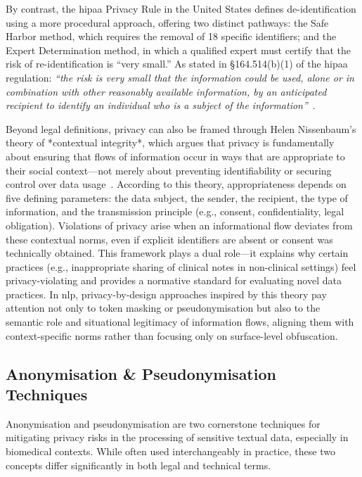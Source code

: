By contrast, the \gls{hipaa} Privacy Rule in the United States defines de-identification using a more procedural approach, offering two distinct pathways: the Safe Harbor method, which requires the removal of 18 specific identifiers; and the Expert Determination method, in which a qualified expert must certify that the risk of re-identification is ``very small.'' As stated in §164.514(b)(1) of the \gls{hipaa} regulation: \textit{``the risk is very small that the information could be used, alone or in combination with other reasonably available information, by an anticipated recipient to identify an individual who is a subject of the information''}~\citep{hipaa_deid}.

Beyond legal definitions, privacy can also be framed through Helen Nissenbaum’s theory of *contextual integrity*, which argues that privacy is fundamentally about ensuring that flows of information occur in ways that are appropriate to their social context—not merely about preventing identifiability or securing control over data usage~\citep{nissenbaum2009privacy}. According to this theory, appropriateness depends on five defining parameters: the data subject, the sender, the recipient, the type of information, and the transmission principle (e.g., consent, confidentiality, legal obligation). Violations of privacy arise when an informational flow deviates from these contextual norms, even if explicit identifiers are absent or consent was technically obtained. This framework plays a dual role—it explains why certain practices (e.g., inappropriate sharing of clinical notes in non-clinical settings) feel privacy-violating and provides a normative standard for evaluating novel data practices. In \gls{nlp}, privacy-by-design approaches inspired by this theory pay attention not only to token masking or pseudonymisation but also to the semantic role and situational legitimacy of information flows, aligning them with context-specific norms rather than focusing only on surface-level obfuscation.

\subsection{Anonymisation \& Pseudonymisation Techniques}

Anonymisation and pseudonymisation are two cornerstone techniques for mitigating privacy risks in the processing of sensitive textual data, especially in biomedical contexts. While often used interchangeably in practice, these two concepts differ significantly in both legal and technical terms.

